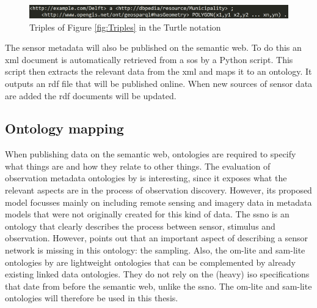 \begin{figure}
	\includegraphics[width=1\linewidth]{figs/Turtle.png}
	\caption{Triples of Figure \ref{fig:Triples} in the Turtle notation}
	\label{fig:Turtle}
\end{figure}

The sensor metadata will also be published on the semantic web. To do this an \ac{xml} document is automatically retrieved from a \ac{sos} by a Python script. This script then extracts the relevant data from the \ac{xml} and maps it to an ontology. It outputs an \ac{rdf} file that will be published online. When new sources of sensor data are added the \ac{rdf} documents will be updated.   

\subsection{Ontology mapping}
When publishing data on the semantic web, ontologies are required to specify what things are and how they relate to other things. The evaluation of observation metadata ontologies by \cite{SW:Hu} is interesting, since it exposes what the relevant aspects are in the process of observation discovery. However, its proposed model focusses mainly on including remote sensing and imagery data in metadata models that were not originally created for this kind of data. The \ac{ssno} is an ontology that clearly describes the process between sensor, stimulus and observation. However, \cite{SSW:Cox4} points out that an important aspect of describing a sensor network is missing in this ontology: the sampling. Also, the om-lite and sam-lite ontologies by \cite{SSW:Cox4} are lightweight ontologies that can be complemented by already existing linked data ontologies. They do not rely on the (heavy) \ac{iso} specifications that date from before the semantic web, unlike the \ac{ssno}. The om-lite and sam-lite ontologies will therefore be used in this thesis. 

